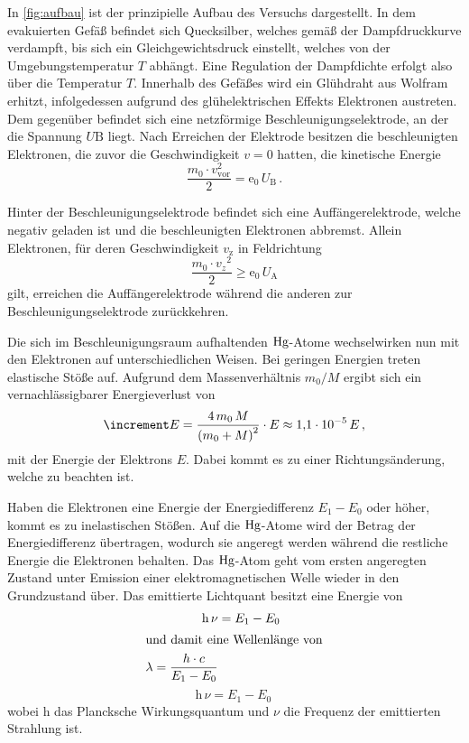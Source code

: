 In \autoref{fig:aufbau} ist der prinzipielle Aufbau des Versuchs dargestellt.
In dem evakuierten Gefäß befindet sich Quecksilber, welches gemäß der Dampfdruckkurve verdampft,
bis sich ein Gleichgewichtsdruck einstellt, welches von der Umgebungstemperatur $T$ abhängt.
Eine Regulation der Dampfdichte erfolgt also über die Temperatur $T$.
Innerhalb des Gefäßes wird ein Glühdraht aus Wolfram erhitzt, 
infolgedessen aufgrund des glühelektrischen Effekts Elektronen austreten.
Dem gegenüber befindet sich eine netzförmige Beschleunigungselektrode, an der die Spannung $U\text{B}$ liegt.
Nach Erreichen der Elektrode besitzen die beschleunigten Elektronen, die zuvor die Geschwindigkeit $v = 0$ hatten, die kinetische Energie
\begin{equation}
    \frac{m_{0} \cdot v_{\mathrm{vor}}^{2}}{2} = \mathrm{e}_{0} \, U_{\mathrm{B}} \, .
\end{equation}

Hinter der Beschleunigungselektrode befindet sich eine Auffängerelektrode, 
welche negativ geladen ist und die beschleunigten Elektronen abbremst.
Allein Elektronen, für deren Geschwindigkeit $v_\text{z}$ in Feldrichtung
\begin{equation}
    \frac{m_{0} \cdot v_{z}{ }^{2}}{2}  \geq \mathrm{e}_{0} \, U_{\mathrm{A}}
\end{equation}
gilt, erreichen die Auffängerelektrode während die anderen zur Beschleunigungselektrode zurückkehren.

Die sich im Beschleunigungsraum aufhaltenden $\ce{Hg}$-Atome wechselwirken nun mit den Elektronen auf unterschiedlichen Weisen.
Bei geringen Energien treten elastische Stöße auf. 
Aufgrund dem Massenverhältnis $m_0/M$ ergibt sich ein vernachlässigbarer Energieverlust von
\begin{equation}
    \increment E=\frac{4 \, m_{0} \, M}{\left(m_{0}+M\right)^{2}} \cdot E \approx \num{1.1e{-5}} \, E \, ,
\end{equation}
mit der Energie der Elektrons $E$. 
Dabei kommt es zu einer Richtungsänderung, welche zu beachten ist.

Haben die Elektronen eine Energie der Energiedifferenz $E_1 - E_0$ oder höher, kommt es zu inelastischen Stößen.
Auf die $\ce{Hg}$-Atome wird der Betrag der Energiedifferenz übertragen, wodurch sie angeregt werden während die restliche Energie die Elektronen behalten. 
Das $\ce{Hg}$-Atom geht vom ersten angeregten Zustand unter Emission einer elektromagnetischen Welle wieder in den Grundzustand über. 
Das emittierte Lichtquant besitzt eine Energie von
\begin{align}
    \text{h} \, \nu &= E_1 - E_0 \\
    \intertext{und damit eine Wellenlänge von}
    \lambda = \frac{h \cdot c}{E_1 - E_0}
\end{align}\begin{equation}
    \text{h} \, \nu = E_1 - E_0 \, 
\end{equation}
wobei h das Plancksche Wirkungsquantum und $\nu$ die Frequenz der emittierten Strahlung ist.


